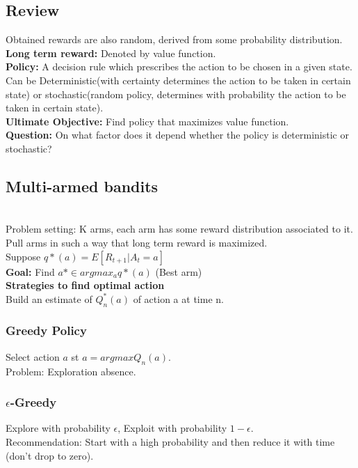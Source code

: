 \documentclass{book}
\begin{document}
\subsection{Review}
Obtained rewards are also random, derived from some probability distribution.\\
\textbf{Long term reward:} Denoted by value function.\\
\textbf{Policy:} A decision rule which prescribes the action to be chosen in a given state.\\
Can be Deterministic(with certainty determines the action to be taken in certain state) or stochastic(random policy, determines with probability the action to be taken in certain state).\\
\textbf{Ultimate Objective:} Find policy that maximizes value function.\\
\textbf{Question:} On what factor does it depend whether the policy is deterministic or stochastic?

\subsection{Multi-armed bandits}
\\
Problem setting: K arms, each arm has some reward distribution associated to it. Pull arms in such a way that long term reward is maximized.\\

\noindent Suppose $q*(a) = E[R_{t+1} | A_{t} = a]$\\
\textbf{Goal:} Find $a* \in argmax_{a} q*(a)$ (Best arm) \\

\textbf{Strategies to find optimal action}\\
Build an estimate of $Q_{n}^{*}(a)$ of action a at time n.\\

\subsubsection{Greedy Policy}
Select action $a$ st $a = argmax Q_{n}(a)$.\\
Problem: Exploration absence.\\

\subsubsection{$\epsilon$-Greedy}
Explore with probability $\epsilon$, Exploit with probability $1-\epsilon$.\\
Recommendation: Start with a high probability and then reduce it with time (don't drop to zero).\\
\end{document}
